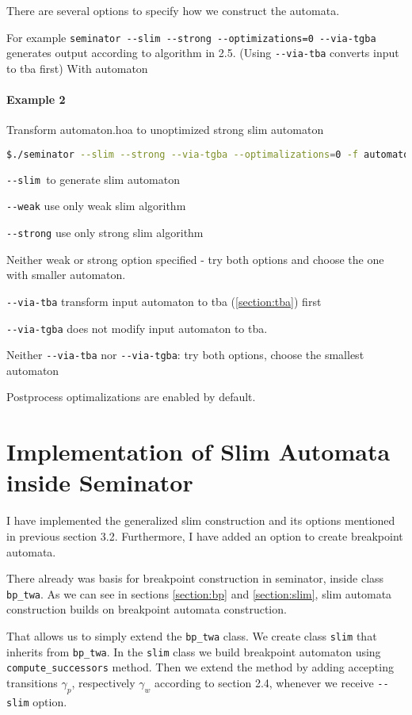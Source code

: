 \documentclass[
	digital
nolof, nolot
]{fithesis3}
\begin{document}
		There are several options to specify how we construct the automata.
		
		For example \texttt{seminator -{}-slim -{}-strong -{}-optimizations=0 -{}-via-tgba} generates output according to algorithm in 2.5. (Using \texttt{-{}-via-tba} converts input to tba first) With automaton
		
		
		\paragraph{Example 2}
		Transform automaton.hoa to unoptimized strong slim automaton
		\begin{lstlisting}[language=bash]
$./seminator --slim --strong --via-tgba --optimalizations=0 -f automaton.hoa
		\end{lstlisting}
		
		 
		
		\texttt{-{}-slim }to generate slim automaton
		
		\texttt{-{}-weak} use only weak slim algorithm
		
		\texttt{-{}-strong} use only strong slim algorithm
		
		Neither weak or strong option specified - try both options  and choose the one with smaller automaton.
		
		\texttt{-{}-via-tba} transform input automaton to tba (\ref{section:tba}) first
		
		\texttt{-{}-via-tgba} does not modify input automaton to tba.
		
		Neither \texttt{-{}-via-tba} nor \texttt{-{}-via-tgba}: try both options, choose the smallest automaton
		
		Postprocess optimalizations are enabled by default.
		
		
	\section{Implementation of Slim Automata inside Seminator}
	I have implemented the generalized slim construction and its options mentioned in previous section 3.2. Furthermore, I have added an option to create breakpoint automata.
	
	There already was basis for breakpoint construction in seminator, inside class \texttt{bp\_twa}.
	As we can see in sections \ref{section:bp} and \ref{section:slim}, slim automata construction builds on breakpoint automata construction.
	
	That allows us to simply extend the \texttt{bp\_twa} class.
	We create class \texttt{slim} that inherits from \texttt{bp\_twa}.
	In the \texttt{slim} class we build breakpoint automaton using \texttt{compute\_successors} method.
	Then we extend the method by adding accepting transitions $\gamma_p$, respectively $\gamma_w$ according to section 2.4, whenever we receive \texttt{-{}-slim} option.
	
\end{document}
